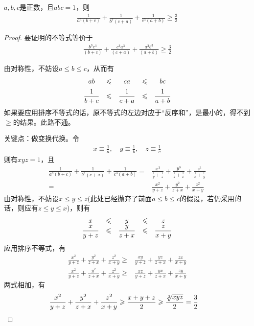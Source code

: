 \begin{example}[IMO 1995]
  $a,b,c$是正数，且$abc=1$，则
  \begin{align*}
    \frac1{a^3(b+c)} + \frac1{b^3(c+a)} + \frac1{c^3(a+b)}\ge\frac32
  \end{align*}
\end{example}
\begin{proof}
  要证明的不等式等价于
  \begin{align*}
    \frac{b^3c^3}{(b+c)} + \frac{c^3a^3}{(c+a)} + \frac{a^3b^3}{(a+b)}\ge\frac32
  \end{align*}

  由对称性，不妨设$a\le b\le c$，从而有
  \begin{align*}
    \begin{array}{*5{>{\displaystyle}c}}
      ab & \le & ca & \le & bc  \\[5pt]
      \frac1{b+c} & \le & \frac1{c+a} & \le & \frac1{a+b}
    \end{array}
  \end{align*}
  如果要应用排序不等式的话，原不等式的左边对应于“反序和”，是最小的，得不到$\ge$的结果。此路不通。

  关键点：做变换代换。令
  \begin{align*}
    x\equiv\frac1a,\quad y\equiv\frac1b,\quad z\equiv\frac1c
  \end{align*}
  则有$xyz=1$，且
  \begin{align*}
    \frac1{a^3(b+c)} + \frac1{b^3(c+a)} + \frac1{c^3(a+b)} =&
    \frac{x^3}{\frac1y+\frac1z} + \frac{y^3}{\frac1z+\frac1x} + \frac{z^3}{\frac1x+\frac1y}\\
    =&\frac{x^2}{y+z}+\frac{y^2}{z+x}+\frac{z^2}{x+y}
  \end{align*}
  由对称性，不妨设$x\le y\le z$(此处已经抛弃了前面$a\le b\le c$的假设，若仍采用的话，则应有$z\le y\le x$)，则有
  \begin{align*}
    \begin{array}{*5{>{\displaystyle}c}}
      x & \le & y & \le & z\\
      \frac{x}{y+z} & \le & \frac{y}{z+x} & \le & \frac{z}{x+y}
    \end{array}
  \end{align*}
  应用排序不等式，有
  \begin{align*}
    \frac{x^2}{y+z}+\frac{y^2}{z+x}+\frac{z^2}{x+y} \ge & \frac{xy}{y+z}+\frac{yz}{z+x}+\frac{zx}{x+y}\\
    \frac{x^2}{y+z}+\frac{y^2}{z+x}+\frac{z^2}{x+y} \ge & \frac{xz}{y+z}+\frac{yx}{z+x}+\frac{zy}{x+y}
  \end{align*}
  两式相加，有
  \begin{align*}
    \frac{x^2}{y+z}+\frac{y^2}{z+x}+\frac{z^2}{x+y} \ge \frac{x+y+z}{2}\ge\frac{\sqrt[3]{xyz}}{2}=\frac32&\qedhere
  \end{align*}
\end{proof}

